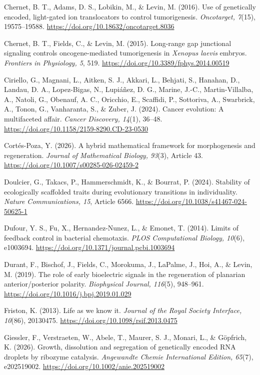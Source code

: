 \documentclass[
  11pt,
]{article}
\begin{document}
Chernet, B. T., Adams, D. S., Lobikin, M., \& Levin, M. (2016). Use of
genetically encoded, light-gated ion translocators to control
tumorigenesis. \emph{Oncotarget, 7}(15), 19575--19588.
\url{https://doi.org/10.18632/oncotarget.8036}

Chernet, B. T., Fields, C., \& Levin, M. (2015). Long-range gap
junctional signaling controls oncogene-mediated tumorigenesis in
\emph{Xenopus laevis} embryos. \emph{Frontiers in Physiology, 5}, 519.
\url{https://doi.org/10.3389/fphys.2014.00519}

Ciriello, G., Magnani, L., Aitken, S. J., Akkari, L., Behjati, S.,
Hanahan, D., Landau, D. A., Lopez-Bigas, N., Lupiáñez, D. G., Marine,
J.-C., Martin-Villalba, A., Natoli, G., Obenauf, A. C., Oricchio, E.,
Scaffidi, P., Sottoriva, A., Swarbrick, A., Tonon, G., Vanharanta, S.,
\& Zuber, J. (2024). Cancer evolution: A multifaceted affair.
\emph{Cancer Discovery, 14}(1), 36--48.
\url{https://doi.org/10.1158/2159-8290.CD-23-0530}

Cortés-Poza, Y. (2026). A hybrid mathematical framework for
morphogenesis and regeneration. \emph{Journal of Mathematical Biology,
93}(3), Article 43. \url{https://doi.org/10.1007/s00285-026-02459-2}

Doulcier, G., Takacs, P., Hammerschmidt, K., \& Bourrat, P. (2024).
Stability of ecologically scaffolded traits during evolutionary
transitions in individuality. \emph{Nature Communications, 15}, Article
6566. \url{https://doi.org/10.1038/s41467-024-50625-1}

Dufour, Y. S., Fu, X., Hernandez-Nunez, L., \& Emonet, T. (2014). Limits
of feedback control in bacterial chemotaxis. \emph{PLOS Computational
Biology, 10}(6), e1003694.
\url{https://doi.org/10.1371/journal.pcbi.1003694}

Durant, F., Bischof, J., Fields, C., Morokuma, J., LaPalme, J., Hoi, A.,
\& Levin, M. (2019). The role of early bioelectric signals in the
regeneration of planarian anterior/posterior polarity. \emph{Biophysical
Journal, 116}(5), 948--961.
\url{https://doi.org/10.1016/j.bpj.2019.01.029}

Friston, K. (2013). Life as we know it. \emph{Journal of the Royal
Society Interface, 10}(86), 20130475.
\url{https://doi.org/10.1098/rsif.2013.0475}

Giessler, F., Verstraeten, W., Abele, T., Maurer, S. J., Monari, L., \&
Göpfrich, K. (2026). Growth, dissolution and segregation of genetically
encoded RNA droplets by ribozyme catalysis. \emph{Angewandte Chemie
International Edition, 65}(7), e202519002.
\url{https://doi.org/10.1002/anie.202519002}
\end{document}
